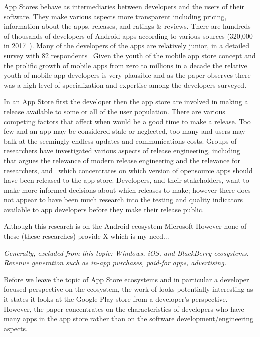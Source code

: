 App Stores behave as intermediaries between developers and the users of their software. They make various aspects more transparent including pricing, information about the apps, releases, and ratings \& reviews. There are hundreds of thousands of developers of Android apps according to various sources (320,000 in 2017~\cite{wang2017_exploratory_study_of_the_mobile_app_ecosystem}). Many of the developers of the apps are relatively junior, in a detailed survey with 82 respondents~\citep[p. 142 and p.134]{francese2017_mobile_app_development_and_management_results_from_a_quantitative_investigation} Given the youth of the mobile app store concept  and the prolific growth of mobile apps from zero to millions in a decade the relative youth of mobile app developers is very plausible and as the paper observes there was a high level of specialization and expertise among the developers surveyed.


In an App Store first the developer then the app store are involved in making a release available to some or all of the user population. There are various competing factors that affect when would be a good time to make a release. Too few and an app may be considered stale or neglected, too many and users may balk at the seemingly endless updates and communications costs. Groups of researchers have investigated various aspects of release engineering, including~\cite{adams2016modern} that argues the relevance of modern release engineering and the relevance for researchers, and~\cite{nayebi2017version} which concentrates on which version of opensource apps should have been released to the app store. Developers, and their stakeholders, want to make more informed decisions about which releases to make; however there does not appear to have been much research into the testing and quality indicators available to app developers before they make their release public.



Although this research is on the Android ecosystem Microsoft 
However none of these (these researches) provide X which is my need... 

\textit{Generally, excluded from this topic: Windows, iOS, and BlackBerry ecosystems. Revenue generation such as in-app purchases, paid-for apps, advertising.} 

Before we leave the topic of App Store ecosystems and in particular a developer focused perspective on the ecosystem, the work of \citet{wang2017_exploratory_study_of_the_mobile_app_ecosystem} looks potentially interesting as it states it looks at the Google Play store from a developer's perspective. However, the paper concentrates on the characteristics of developers who have many apps in the app store rather than on the software development/engineering aspects.

